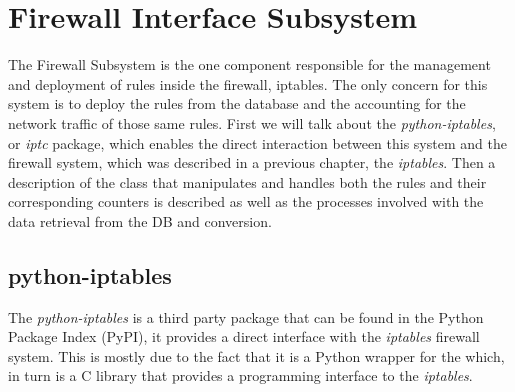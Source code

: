 



\section{Firewall Interface Subsystem}
\label{chap4:sec:firewall-sys}
The Firewall Subsystem is the one component responsible for the management and
deployment of rules inside the firewall, iptables. The only concern for this
system is to deploy the rules from the database and the accounting for the
network traffic of those same rules. First we will talk about the
\emph{python-iptables}, or \emph{iptc} package, which enables the direct
interaction between this system and the firewall system, which was described in
a previous chapter, the \emph{iptables}. Then a description of the class that
manipulates and handles both the rules and their corresponding counters is
described as well as the processes involved with the data retrieval from the DB
and conversion.

\subsection{python-iptables}
\label{chap4:sec:firewall-sys:iptc}
The \emph{python-iptables} is a third party package that can be found in the
Python Package Index (PyPI), it provides a direct interface with the
\emph{iptables} firewall system. This is mostly due to the fact that it is a
Python wrapper for the  which, in turn is a C library that
provides a programming interface to the \emph{iptables}.

